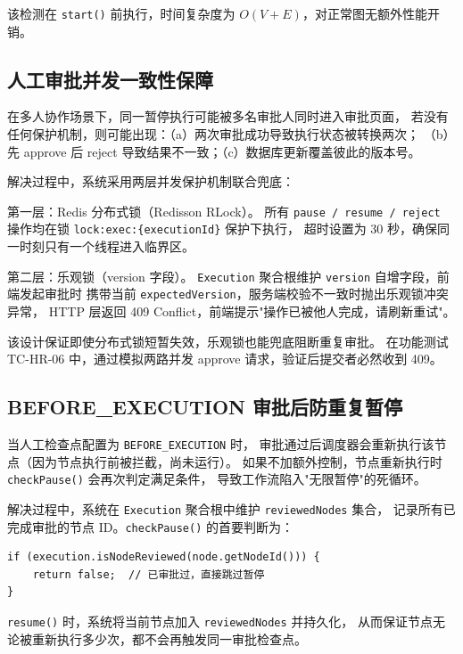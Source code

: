 该检测在 \texttt{start()} 前执行，时间复杂度为 $O(V + E)$，对正常图无额外性能开销。

\subsection{人工审批并发一致性保障}


在多人协作场景下，同一暂停执行可能被多名审批人同时进入审批页面，
若没有任何保护机制，则可能出现：（a）两次审批成功导致执行状态被转换两次；
（b）先 approve 后 reject 导致结果不一致；（c）数据库更新覆盖彼此的版本号。


解决过程中，系统采用两层并发保护机制联合兜底：

第一层：Redis 分布式锁（Redisson RLock）。
所有 \texttt{pause / resume / reject} 操作均在锁 \texttt{lock:exec:\{executionId\}} 保护下执行，
超时设置为 30 秒，确保同一时刻只有一个线程进入临界区。

第二层：乐观锁（version 字段）。
\texttt{Execution} 聚合根维护 \texttt{version} 自增字段，前端发起审批时
携带当前 \texttt{expectedVersion}，服务端校验不一致时抛出乐观锁冲突异常，
HTTP 层返回 409 Conflict，前端提示"操作已被他人完成，请刷新重试"。

该设计保证即使分布式锁短暂失效，乐观锁也能兜底阻断重复审批。
在功能测试 TC-HR-06 中，通过模拟两路并发 approve 请求，验证后提交者必然收到 409。

\subsection{BEFORE\_EXECUTION 审批后防重复暂停}


当人工检查点配置为 \texttt{BEFORE\_EXECUTION} 时，
审批通过后调度器会重新执行该节点（因为节点执行前被拦截，尚未运行）。
如果不加额外控制，节点重新执行时 \texttt{checkPause()} 会再次判定满足条件，
导致工作流陷入"无限暂停"的死循环。


解决过程中，系统在 \texttt{Execution} 聚合根中维护 \texttt{reviewedNodes} 集合，
记录所有已完成审批的节点 ID。\texttt{checkPause()} 的首要判断为：

\begin{lstlisting}[style=java, caption={checkPause() 已审批节点跳过逻辑}]
if (execution.isNodeReviewed(node.getNodeId())) {
    return false;  // 已审批过，直接跳过暂停
}
\end{lstlisting}

\texttt{resume()} 时，系统将当前节点加入 \texttt{reviewedNodes} 并持久化，
从而保证节点无论被重新执行多少次，都不会再触发同一审批检查点。

